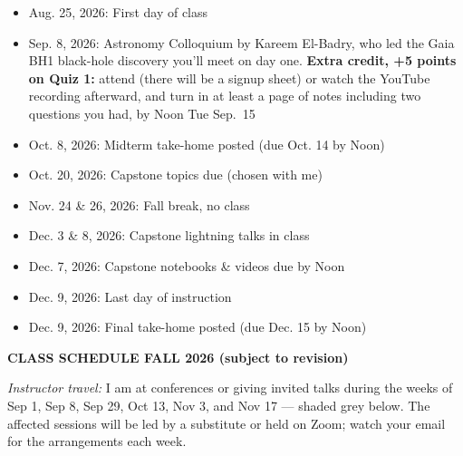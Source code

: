 \begin{itemize}
    \setlength\itemsep{0.05em}
    \footnotesize
    \item Aug. 25, 2026: First day of class\\
    \item Sep. \phantom{0}8, 2026: Astronomy Colloquium by Kareem El-Badry, who led the Gaia BH1 black-hole discovery you'll meet on day one. {\bf Extra credit, +5 points on Quiz 1:} attend (there will be a signup sheet) or watch the YouTube recording afterward, and turn in at least a page of notes including two questions you had, by Noon Tue Sep.~15\\
    \item Oct. \phantom{0}8, 2026: Midterm take-home posted (due Oct. 14 by Noon)\\
    \item Oct. 20, 2026: Capstone topics due (chosen with me)\\
    \item Nov. 24 \& 26, 2026: Fall break, no class\\
    \item Dec. \phantom{0}3 \& 8, 2026: Capstone lightning talks in class\\
    \item Dec. \phantom{0}7, 2026: Capstone notebooks \& videos due by Noon\\
    \item Dec. \phantom{0}9, 2026: Last day of instruction\\
    \item Dec. \phantom{0}9, 2026: Final take-home posted (due Dec. 15 by Noon)\\
\end{itemize}

{\large \bf \headerfont \color{RoyalBlue} CLASS SCHEDULE FALL 2026 (subject to revision)}

{\footnotesize \emph{Instructor travel:} I am at conferences or giving invited
talks during the weeks of Sep 1, Sep 8, Sep 29, Oct 13, Nov 3, and Nov 17 ---
shaded grey below. The affected sessions will be led by a substitute or held
on Zoom; watch your email for the arrangements each week.}

\newcommand{\travelrow}[1]{\colorbox{gray!25}{\parbox[t]{\dimexpr\linewidth-2\fboxsep\relax}{\makebox[0pt][r]{\textbullet\kern 0.85em}#1}}}


